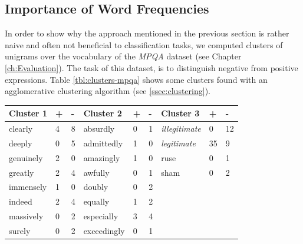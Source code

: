 \subsection{Importance of Word Frequencies}
\label{ssec:importance-word-frequencies}
In order to show why the approach mentioned in the previous section is rather
naive and often not beneficial to classification tasks, we computed clusters of unigrams over
the vocabulary of the \emph{MPQA}  dataset (see Chapter \ref{ch:Evaluation}). 
The task of this dataset, is to distinguish negative from positive expressions. 
Table \ref{tbl:clusters-mpqa} shows some clusters found with an agglomerative 
clustering algorithm (see \ref{ssec:clustering}).
\begin{table}
\centering

\begin{tabular}{lll|lll|lll}
\textbf{Cluster 1} & \textbf{+} & \textbf{-} & \textbf{Cluster 2} & \textbf{+} & \textbf{-} & \textbf{Cluster 3}                         & \textbf{+} & \textbf{-} \\ \hline
clearly            & 4          & 8          & absurdly           & 0          & 1          & {\color[HTML]{FE0000} \textit{illegitimate}} & 0          & 12         \\
deeply             & 0          & 5          & admittedly         & 1          & 0          & {\color[HTML]{FE0000} \textit{legitimate}}   & 35         & 9          \\
genuinely          & 2          & 0          & amazingly          & 1          & 0          & ruse                                         & 0          & 1          \\
greatly            & 2          & 4          & awfully            & 0          & 1          & sham                                         & 0          & 2          \\
immensely          & 1          & 0          & doubly             & 0          & 2          &                                              &            &            \\
indeed             & 2          & 4          & equally            & 1          & 2          &                                              &            &            \\
massively          & 0          & 2          & especially         & 3          & 4          &                                              &            &            \\
surely             & 0          & 2          & exceedingly        & 0          & 1          &                                              &            &            \\

\end{tabular}
\end{table}

